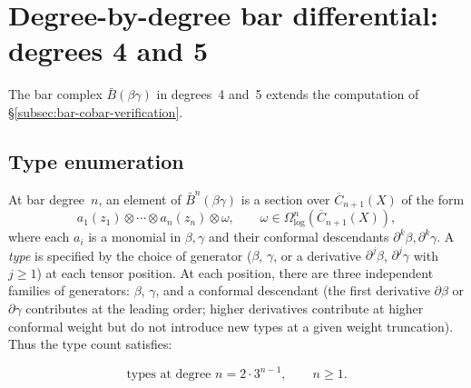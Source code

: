 \section{Degree-by-degree bar differential: degrees 4 and 5}
\label{sec:betagamma-bar-degree45}

The bar complex $\bar{B}(\beta\gamma)$ in degrees~4 and~5 extends the computation of \S\ref{subsec:bar-cobar-verification}.

\subsection{Type enumeration}

At bar degree~$n$, an element of $\bar{B}^n(\beta\gamma)$ is a section
over $\overline{C}_{n+1}(X)$ of the form
\[
a_1(z_1) \otimes \cdots \otimes a_n(z_n) \otimes \omega,
\qquad \omega \in \Omega^n_{\log}(\overline{C}_{n+1}(X)),
\]
where each $a_i$ is a monomial in $\beta, \gamma$ and their
conformal descendants $\partial^k \beta, \partial^k \gamma$.
A \emph{type} is specified by the choice of generator
($\beta$, $\gamma$, or a derivative $\partial^j \beta$,
$\partial^j \gamma$ with $j \geq 1$) at each tensor position.
At each position, there are three independent families of
generators: $\beta$, $\gamma$, and a conformal descendant
(the first derivative $\partial \beta$ or $\partial \gamma$
contributes at the leading order; higher derivatives contribute at
higher conformal weight but do not introduce new types at a given
weight truncation).  Thus the type count satisfies:

\begin{equation}\label{eq:betagamma-type-count}
\text{types at degree } n = 2 \cdot 3^{n-1}, \qquad n \geq 1.
\end{equation}

